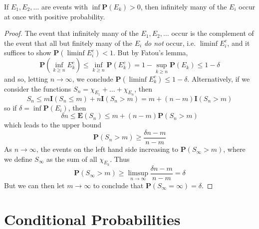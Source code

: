 \begin{theorem}
    If $E_1, E_2, \dots$ are events with $\inf \mathbf{P}(E_k) > 0$, then infinitely many of the $E_i$ occur at once with positive probability.
\end{theorem}
\begin{proof}
    The event that infinitely many of the $E_1, E_2, \dots$ occur is the complement of the event that all but finitely many of the $E_i$ {\it do not} occur, i.e. $\liminf E_i^c$, and it suffices to show $\mathbf{P}(\liminf E_i^c) < 1$. But by Fatou's lemma,
    \[ \mathbf{P} \left(\inf_{k \geq n} E_k^c \right) \leq \inf_{k \geq n} \mathbf{P}(E_k^c) = 1 - \sup_{k \geq n} \mathbf{P}(E_k) \leq 1 - \delta \]
    and so, letting $n \to \infty$, we conclude $\mathbf{P}(\liminf E_k^c) \leq 1 - \delta$. Alternatively, if we consider the functions $S_n = \chi_{E_1} + \dots + \chi_{E_n}$, then
    \[ S_n \leq m \mathbf{I}(S_n \leq m) + n \mathbf{I}(S_n > m) = m + (n - m) \mathbf{I}(S_n > m) \]
    so if $\delta = \inf \mathbf{P}(E_i)$, then
    \[ \delta n \leq \mathbf{E}(S_n) \leq m + (n - m) \mathbf{P}(S_n > m) \]
    which leads to the upper bound
    \[ \mathbf{P}(S_n > m) \geq \frac{\delta n - m}{n - m} \]
    As $n \to \infty$, the events on the left hand side increasing to $\mathbf{P}(S_\infty > m)$, where we define $S_\infty$ as the sum of all $\chi_{E_k}$. Thus
    \[ \mathbf{P}(S_\infty > m) \geq \limsup_{n \to \infty} \frac{\delta n - m}{n - m} = \delta \]
    But we can then let $m \to \infty$ to conclude that $\mathbf{P}(S_\infty = \infty) = \delta$.
\end{proof}

\section{Conditional Probabilities}

